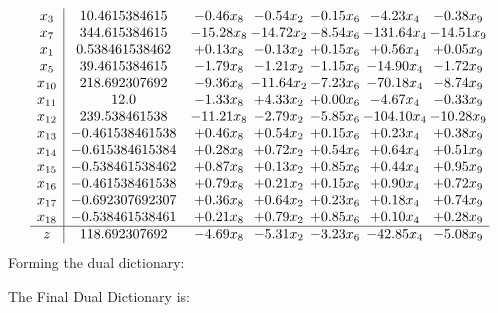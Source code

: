 \documentclass[8pt]{article}
\begin{document}
\[\begin{array}{c| c c@{\hskip 2pt} c@{\hskip 2pt} c@{\hskip 2pt} c@{\hskip 2pt} c@{\hskip 2pt} }
 x_{3}   &  10.4615384615 & -0.46 x_{8} & -0.54 x_{2} & -0.15 x_{6} & -4.23 x_{4} & -0.38 x_{9}\\
 x_{7}   &  344.615384615 & -15.28 x_{8} & -14.72 x_{2} & -8.54 x_{6} & -131.64 x_{4} & -14.51 x_{9}\\
 x_{1}   &  0.538461538462 & +  0.13 x_{8} & -0.13 x_{2} & +  0.15 x_{6} & +  0.56 x_{4} & +  0.05 x_{9}\\
 x_{5}   &  39.4615384615 & -1.79 x_{8} & -1.21 x_{2} & -1.15 x_{6} & -14.90 x_{4} & -1.72 x_{9}\\
 x_{10}   &  218.692307692 & -9.36 x_{8} & -11.64 x_{2} & -7.23 x_{6} & -70.18 x_{4} & -8.74 x_{9}\\
 x_{11}   &  12.0 & -1.33 x_{8} & +  4.33 x_{2} & +  0.00 x_{6} & -4.67 x_{4} & -0.33 x_{9}\\
 x_{12}   &  239.538461538 & -11.21 x_{8} & -2.79 x_{2} & -5.85 x_{6} & -104.10 x_{4} & -10.28 x_{9}\\
 x_{13}   &  -0.461538461538 & +  0.46 x_{8} & +  0.54 x_{2} & +  0.15 x_{6} & +  0.23 x_{4} & +  0.38 x_{9}\\
 x_{14}   &  -0.615384615384 & +  0.28 x_{8} & +  0.72 x_{2} & +  0.54 x_{6} & +  0.64 x_{4} & +  0.51 x_{9}\\
 x_{15}   &  -0.538461538462 & +  0.87 x_{8} & +  0.13 x_{2} & +  0.85 x_{6} & +  0.44 x_{4} & +  0.95 x_{9}\\
 x_{16}   &  -0.461538461538 & +  0.79 x_{8} & +  0.21 x_{2} & +  0.15 x_{6} & +  0.90 x_{4} & +  0.72 x_{9}\\
 x_{17}   &  -0.692307692307 & +  0.36 x_{8} & +  0.64 x_{2} & +  0.23 x_{6} & +  0.18 x_{4} & +  0.74 x_{9}\\
 x_{18}   &  -0.538461538461 & +  0.21 x_{8} & +  0.79 x_{2} & +  0.85 x_{6} & +  0.10 x_{4} & +  0.28 x_{9}\\
\hline
z    &  118.692307692 & -4.69 x_{8} & -5.31 x_{2} & -3.23 x_{6} & -42.85 x_{4} & -5.08 x_{9}\\
\end{array}\]
Forming the dual dictionary:

The Final Dual Dictionary is: 
\end{document}
